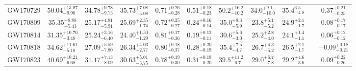 \begin{table}[]
\begin{tabular}{cccccc|ccccc}
\multicolumn{1}{c|}{GW170729} & $50.04_{-9.98}^{+13.97}$& $34.78_{-9.73}^{+9.78}$& $35.73_{-5.08}^{+7.08}$& $0.71_{-0.28}^{+0.26}$& $0.51_{-0.23}^{+0.18}$&  $50.2_{-10.2}^{+16.2}$             &  $34.0_{-10.0}^{+9.1}$             & $35.4_{-4.8}^{6.5}$                      &     & $0.37_{-0.25}^{+0.21}$              \\
\multicolumn{1}{c|}{GW170809} & $35.35_{-5.43}^{+8.88}$& $25.17_{-5.91}^{+4.81}$& $25.69_{-1.74}^{+2.35}$& $0.72_{-0.27}^{+0.25}$& $0.24_{-0.14}^{+0.16}$&    $35.0_{-5.9}^{+8.3}$           &                 $23.8_{-5.2}^{+5.1}$                     &  $24.9_{-1.7}^{+2.1}$   & & $0.08_{-0.17}^{+0.17}$             \\
\multicolumn{1}{c|}{GW170814}& $31.35_{-3.48}^{+10.70}$& $25.24_{-6.40}^{+3.16}$& $24.40_{-1.29}^{+1.50}$& $0.81_{-0.36}^{+0.17}$& $0.19_{-0.11}^{+0.12}$&  $30.6_{-3.0}^{+5.6}$             &               $25.2_{-4.0}^{+2.8}$&   $24.1_{-1.1}^{+1.4}$                    &     &   $0.06_{-0.12}^{+0.12}$           \\
\multicolumn{1}{c|}{GW170818} &$34.62_{-5.18}^{+11.61}$& $27.09_{-7.80}^{+5.59}$& $26.34_{-2.77}^{+4.03}$& $0.80_{-0.37}^{+0.18}$& $0.28_{-0.19}^{+0.20}$&   $35.4_{-4.7}^{+7.5}$            &               $26.7_{-5.2}^{+4.3}$& $26.5_{-1.7}^{+2.1}$                      &     &  $-0.09_{-0.21}^{+0.18}$            \\
\multicolumn{1}{c|}{GW170823} & $40.69_{-6.68}^{+10.21}$& $31.17_{-8.09}^{+7.13}$& $30.63_{-3.75}^{+5.01}$& $0.78_{-0.30}^{+0.19}$& $0.31_{-0.20}^{+0.18}$&  $39.5_{-6.7}^{+11.2}$             &               $29.0_{-7.8}^{+6.7}$&   $29.2_{-3.6}^{+4.6}$                    &     &   $0.09_{-0.26}^{+0.22}$           \\ \hline
\end{tabular}
\end{table}

